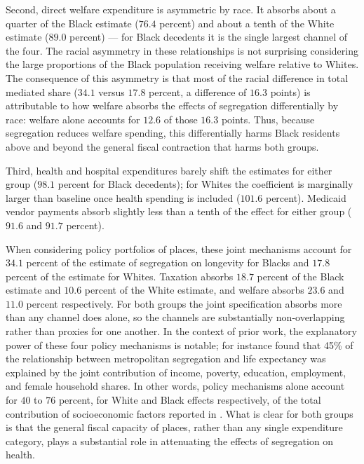 \documentclass[11pt]{article}
\begin{document}
Second, direct welfare expenditure is asymmetric by race. It absorbs about a quarter of the Black estimate ($76.4$ percent) and about a tenth of the White estimate ($89.0$ percent) --- for Black decedents it is the single largest channel of the four. The racial asymmetry in these relationships is not surprising considering the large proportions of the Black population receiving welfare relative to Whites. The consequence of this asymmetry is that most of the racial difference in total mediated share ($34.1$ versus $17.8$ percent, a difference of $16.3$ points) is attributable to how welfare absorbs the effects of segregation differentially by race: welfare alone accounts for $12.6$ of those $16.3$ points. Thus, because segregation reduces welfare spending, this differentially harms Black residents above and beyond the general fiscal contraction that harms both groups.

Third, health and hospital expenditures barely shift the estimates for either group ($98.1$ percent for Black decedents); for Whites the coefficient is marginally larger than baseline once health spending is included ($101.6$ percent). Medicaid vendor payments absorb slightly less than a tenth of the effect for either group ($91.6$ and $91.7$ percent).

When considering policy portfolios of places, these joint mechanisms account for $34.1$ percent of the estimate of segregation on longevity for Blacks and $17.8$ percent of the estimate for Whites. Taxation absorbs $18.7$ percent of the Black estimate and $10.6$ percent of the White estimate, and welfare absorbs $23.6$ and $11.0$ percent respectively. For both groups the joint specification absorbs more than any channel does alone, so the channels are substantially non-overlapping rather than proxies for one another. In the context of prior work, the explanatory power of these four policy mechanisms is notable; \citet{popescu_racial_2018} for instance found that 45\% of the relationship between metropolitan segregation and life expectancy was explained by the joint contribution of income, poverty, education, employment, and female household shares. In other words, policy mechanisms alone account for $40$ to $76$ percent, for White and Black effects respectively, of the total contribution of socioeconomic factors reported in \citet{popescu_racial_2018}. What is clear for both groups is that the general fiscal capacity of places, rather than any single expenditure category, plays a substantial role in attenuating the effects of segregation on health. 
\end{document}
